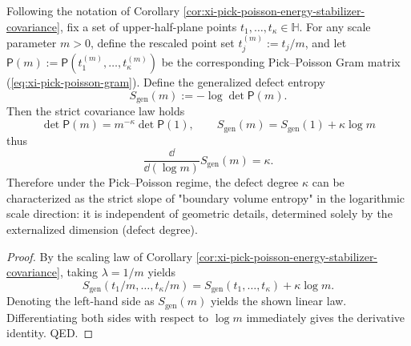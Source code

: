 
\begin{corollary}[Defect Degree as Entropy Slope in Logarithmic Scale: \texorpdfstring{$\frac{\dd}{\dd(\log m)}S_{\mathrm{gen}}(m)=\kappa$}{d/dlogm S_gen(m)=kappa}]\label{cor:xi-pick-poisson-entropy-derivative-visible-dimension}
Following the notation of Corollary \ref{cor:xi-pick-poisson-energy-stabilizer-covariance}, fix a set of upper-half-plane points \(t_1,\dots,t_\kappa\in\mathbb{H}\).
For any scale parameter \(m>0\), define the rescaled point set \(t^{(m)}_j:=t_j/m\), and let \(\mathsf P(m):=\mathsf P(t^{(m)}_1,\dots,t^{(m)}_\kappa)\) be the corresponding Pick--Poisson Gram matrix (\eqref{eq:xi-pick-poisson-gram}).
Define the generalized defect entropy
\[
S_{\mathrm{gen}}(m):=-\log\det\mathsf P(m).
\]
Then the strict covariance law holds
\[
\boxed{\;
\det\mathsf P(m)=m^{-\kappa}\det\mathsf P(1),\qquad
S_{\mathrm{gen}}(m)=S_{\mathrm{gen}}(1)+\kappa\log m\;}
\]
thus
\[
\boxed{\;\frac{\dd}{\dd(\log m)}S_{\mathrm{gen}}(m)=\kappa.\;}
\]
Therefore under the Pick--Poisson regime, the defect degree \(\kappa\) can be characterized as the strict slope of "boundary volume entropy" in the logarithmic scale direction: it is independent of geometric details, determined solely by the externalized dimension (defect degree).
\end{corollary}
\begin{proof}
By the scaling law of Corollary \ref{cor:xi-pick-poisson-energy-stabilizer-covariance}, taking \(\lambda=1/m\) yields
\[
S_{\mathrm{gen}}(t_1/m,\dots,t_\kappa/m)=S_{\mathrm{gen}}(t_1,\dots,t_\kappa)+\kappa\log m.
\]
Denoting the left-hand side as \(S_{\mathrm{gen}}(m)\) yields the shown linear law.
Differentiating both sides with respect to \(\log m\) immediately gives the derivative identity. QED.
\end{proof}

